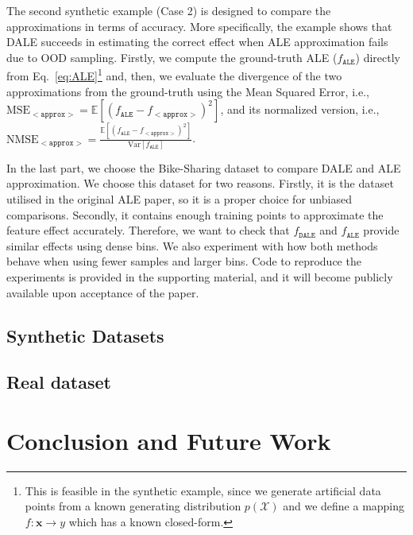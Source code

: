 \documentclass[wcp]{jmlr}
\newcommand{\ale}{f_{\mathtt{ALE}}}
\newcommand{\xb}{\mathbf{x}}
\newcommand{\E}{\mathbb{E}}
\begin{document}
The second synthetic example (Case 2) is designed to compare the
approximations in terms of accuracy. More specifically, the example
shows that DALE succeeds in estimating the correct effect when ALE
approximation fails due to OOD sampling. Firstly, we compute the
ground-truth ALE (\(f_{\mathtt{ALE}}\)) directly from
Eq.~\eqref{eq:ALE}\footnote{This is feasible in the synthetic example,
  since we generate artificial data points from a known generating
  distribution \(p(\mathcal{X}) \) and we define a mapping
  \( f: \xb \rightarrow y \) which has a known closed-form.} and,
then, we evaluate the divergence of the two approximations from the
ground-truth using the Mean Squared Error, i.e.,
\(\text{MSE}_{\mathtt{<approx>}} = \E[(\ale -
f_{\mathtt{<approx>}})^2] \), and its normalized version, i.e.,
\(\text{NMSE}_{\mathtt{<approx>}} = \frac{\E[(\ale -
  f_{\mathtt{<approx>}})^2]}{\text{Var}[\ale]}\).

In the last part, we choose the Bike-Sharing dataset to compare DALE
and ALE approximation. We choose this dataset for two
reasons. Firstly, it is the dataset utilised in the original ALE
paper, so it is a proper choice for unbiased comparisons. Secondly, it
contains enough training points to approximate the feature effect
accurately. Therefore, we want to check that \(f_{\mathtt{DALE}}\) and
\(\hat{f}_{\mathtt{ALE}}\) provide similar effects using dense
bins. We also experiment with how both methods behave when using fewer
samples and larger bins. Code to reproduce the experiments is provided
in the supporting material, and it will become publicly available upon
acceptance of the paper.

\subsection{Synthetic Datasets}

\label{sec:5-1-artificial-experiments}

\subsection{Real dataset}

\label{sec:5-2-real-datasets}

\section{Conclusion and Future Work}




%


\end{document}
